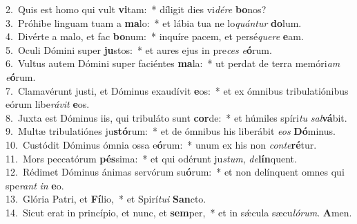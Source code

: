 {2.~}Quis est homo qui vult \textbf{vi}tam:~* díligit dies vi\textit{dé}\textit{re} \textbf{bo}nos?\\
{3.~}Próhibe linguam tuam a \textbf{ma}lo:~* et lábia tua ne lo\textit{quán}\textit{tur} \textbf{do}lum.\\
{4.~}Divérte a malo, et fac \textbf{bo}num:~* inquíre pacem, et persé\textit{que}\textit{re} \textbf{e}am.\\
{5.~}Oculi Dómini super \textbf{ju}stos:~* et aures ejus in pre\textit{ces} \textit{e}\textbf{ó}rum.\\
{6.~}Vultus autem Dómini super faciéntes \textbf{ma}la:~* ut perdat de terra memóri\textit{am} \textit{e}\textbf{ó}rum.\\
{7.~}Clamavérunt justi, et Dóminus exaudívit \textbf{e}os:~* et ex ómnibus tribulatiónibus eórum libe\textit{rá}\textit{vit} \textbf{e}os.\\
{8.~}Juxta est Dóminus iis, qui tribuláto sunt \textbf{cor}de:~* et húmiles spíri\textit{tu} \textit{sal}\textbf{vá}bit.\\
{9.~}Multæ tribulatiónes ju\textbf{stó}rum:~* et de ómnibus his liberábit \textit{e}\textit{os} \textbf{Dó}minus.\\
{10.~}Custódit Dóminus ómnia ossa e\textbf{ó}rum:~* unum ex his non \textit{con}\textit{te}\textbf{ré}tur.\\
{11.~}Mors peccatórum \textbf{pés}sima:~* et qui odérunt ju\textit{stum}, \textit{de}\textbf{lín}quent.\\
{12.~}Rédimet Dóminus ánimas servórum su\textbf{ó}rum:~* et non delínquent omnes qui spe\textit{rant} \textit{in} \textbf{e}o.\\
{13.~}Glória Patri, et \textbf{Fí}lio,~* et Spirí\textit{tu}\textit{i} \textbf{San}cto.\\
{14.~}Sicut erat in princípio, et nunc, et \textbf{sem}per,~* et in sǽcula sæcu\textit{ló}\textit{rum}. \textbf{A}men.\\

